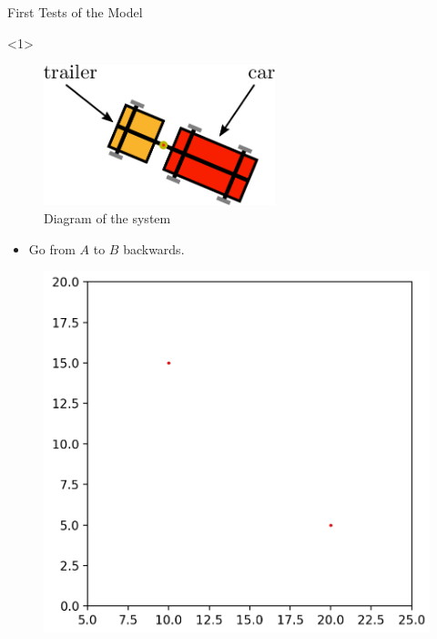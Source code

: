 \begin{frame}{First Tests of the Model}

\begin{onlyenv}<1>
\begin{minipage}{.5\textwidth}
    \begin{figure}[H]
        \centering
        \includegraphics[width=0.6\textwidth]{images/car-trailer}
        \caption{Diagram of the system}
        \label{fig:car-trailer-diag}
    \end{figure}
    \begin{itemize}
        \item Go from $A$ to $B$ backwards.
    \end{itemize}
\end{minipage}%
\begin{minipage}{0.5\textwidth}
    \begin{figure}[H]
        \centering
        \includegraphics[width=\textwidth]{images/points}
        \label{fig:points}
    \end{figure}
\end{minipage}
\end{onlyenv}


\end{frame}
